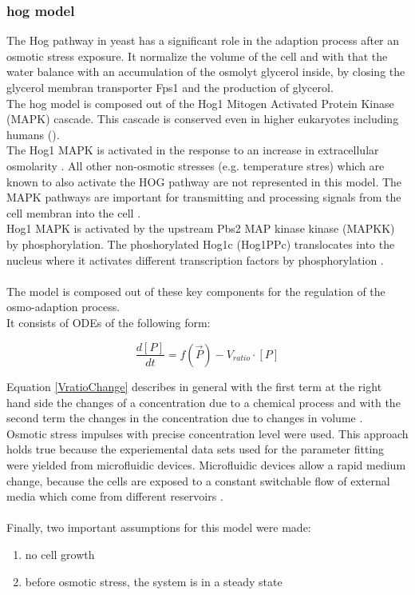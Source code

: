 \subsubsection{hog model}
The Hog pathway in yeast has a significant role in the adaption process after an osmotic stress exposure. It normalize the volume of the cell and with that the water balance with an accumulation of the osmolyt glycerol inside, by closing the glycerol membran transporter Fps1 \cite{Saito2012} \cite{ASimpleMathematicalModel} and the production of glycerol.  \\
The hog model is composed out of the Hog1 Mitogen Activated Protein Kinase (MAPK) cascade. This cascade is conserved even in higher eukaryotes including humans (\cite{ASimpleMathematicalModel}). \\ 
The Hog1 MAPK is activated in the response to an increase in extracellular osmolarity \cite{Saito2012}. All other non-osmotic stresses (e.g. temperature stres) which are known to also activate the HOG pathway \cite{Saito2012} are not represented in this model. The MAPK pathways are important for transmitting and processing signals from the cell membran into the cell \cite{ASimpleMathematicalModel}. \\
Hog1 MAPK is activated by the upstream Pbs2 MAP kinase kinase (MAPKK) by phosphorylation. The phoshorylated Hog1c (Hog1PPc) translocates into the nucleus where it activates different transcription factors by phosphorylation \cite{JannisUhlendorf} \cite{Zi_2010}.\\\\
The model is composed out of these key components for the regulation of the osmo-adaption process.\\
It consists of ODEs of the following form:

\begin{equation}\label{VratioChange}
\frac{d[P]}{dt} = f(\vec{P})-V_{ratio}\cdot [P]
\end{equation}

Equation \ref{VratioChange} describes in general  with the first term at the right hand side the changes of a concentration due to a chemical process and with the second term the changes in the concentration due to changes in volume \cite{Ke_2013}.\\
Osmotic stress impulses with precise concentration level were used. This approach holds true because the experiemental data sets used for the parameter fitting were yielded from microfluidic devices. Microfluidic devices allow a rapid medium change, because the cells are exposed to a constant switchable flow of external media which come from different reservoirs \cite{Zi_2010}. \\\\
Finally, two important assumptions for this model were made:
\begin{enumerate}
	\item no cell growth
	\item before osmotic stress, the system is in a steady state
\end{enumerate}


\newpage